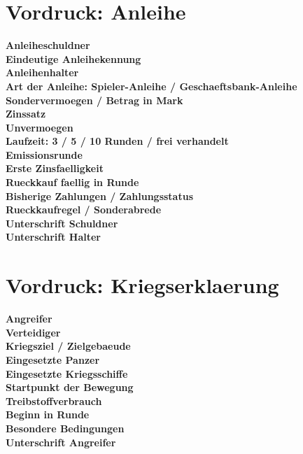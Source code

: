 \documentclass[11pt,a4paper,oneside,parskip=half]{scrreprt}
\newcommand{\formline}[1]{\textbf{#1}\enspace\hrulefill}
\begin{document}
\chapter{Vordruck: Anleihe}

\begin{framed}
\noindent\formline{Anleiheschuldner}\\[1.2em]
\formline{Eindeutige Anleihekennung}\\[1.2em]
\formline{Anleihenhalter}\\[1.2em]
\formline{Art der Anleihe: Spieler-Anleihe / Geschaeftsbank-Anleihe}\\[1.2em]
\formline{Sondervermoegen / Betrag in Mark}\\[1.2em]
\formline{Zinssatz}\\[1.2em]
\formline{Unvermoegen}\\[1.2em]
\formline{Laufzeit: 3 / 5 / 10 Runden / frei verhandelt}\\[1.2em]
\formline{Emissionsrunde}\\[1.2em]
\formline{Erste Zinsfaelligkeit}\\[1.2em]
\formline{Rueckkauf faellig in Runde}\\[1.2em]
\formline{Bisherige Zahlungen / Zahlungsstatus}\\[1.2em]
\formline{Rueckkaufregel / Sonderabrede}\\[2.2em]
\formline{Unterschrift Schuldner}\\[1.2em]
\formline{Unterschrift Halter}
\end{framed}

\chapter{Vordruck: Kriegserklaerung}

\begin{framed}
\noindent\formline{Angreifer}\\[1.2em]
\formline{Verteidiger}\\[1.2em]
\formline{Kriegsziel / Zielgebaeude}\\[1.2em]
\formline{Eingesetzte Panzer}\\[1.2em]
\formline{Eingesetzte Kriegsschiffe}\\[1.2em]
\formline{Startpunkt der Bewegung}\\[1.2em]
\formline{Treibstoffverbrauch}\\[1.2em]
\formline{Beginn in Runde}\\[1.2em]
\formline{Besondere Bedingungen}\\[2.2em]
\formline{Unterschrift Angreifer}
\end{framed}
\end{document}
